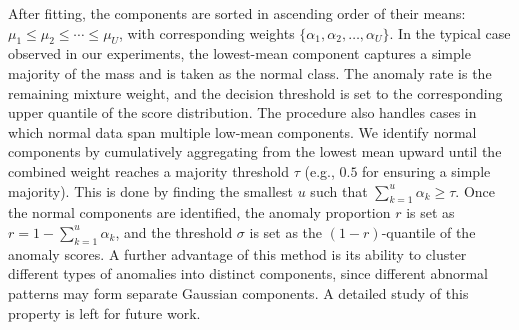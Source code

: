 \documentclass[pdflatex,sn-mathphys-num]{sn-jnl}%
\theoremstyle{thmstyleone}
\theoremstyle{thmstyletwo}%
\theoremstyle{thmstylethree}%
\begin{document}
After fitting, the components are sorted in ascending order of their means: $\mu_1 \le \mu_2 \le \cdots \le \mu_U$, with corresponding weights $\{\alpha_1, \alpha_2, \ldots, \alpha_U\}$. In the typical case observed in our experiments, the lowest-mean component captures a simple majority of the mass and is taken as the normal class. The anomaly rate is the remaining mixture weight, and the decision threshold is set to the corresponding upper quantile of the score distribution. The procedure also handles cases in which normal data span multiple low-mean components.
We identify normal components by cumulatively aggregating from the lowest mean upward until the combined weight reaches a majority threshold $\tau$ (e.g., $0.5$ for ensuring a simple majority). This is done by finding the smallest $u$ such that $\sum_{k=1}^{u} \alpha_k \ge \tau$. Once the normal components are identified, the anomaly proportion $r$ is set as $r = 1 - \sum_{k=1}^{u} \alpha_k$, and the threshold $\sigma$ is set as the $(1-r)$-quantile of the anomaly scores.
A further advantage of this method is its ability to cluster different types of anomalies into distinct components, since different abnormal patterns may form separate Gaussian components. A detailed study of this property is left for future work.
\end{document}
